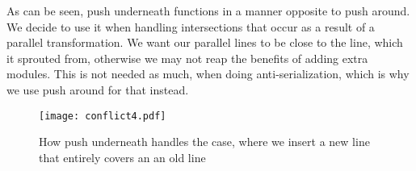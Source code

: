 As can be seen, push underneath functions in a manner opposite to push around. We decide to use it when handling intersections that occur as a result of a parallel transformation. We want our parallel lines to be close to the line, which it sprouted from, otherwise we may not reap the benefits of adding extra modules. This is not needed as much, when doing anti-serialization, which is why we use push around for that instead.

  

\begin{figure}[h]
\centering
\texttt{[image: conflict4.pdf]}
\caption{How push underneath handles the case, where we insert a new line that  entirely covers an an old line}
\label{fig:pushunderneath2}
\end{figure}

